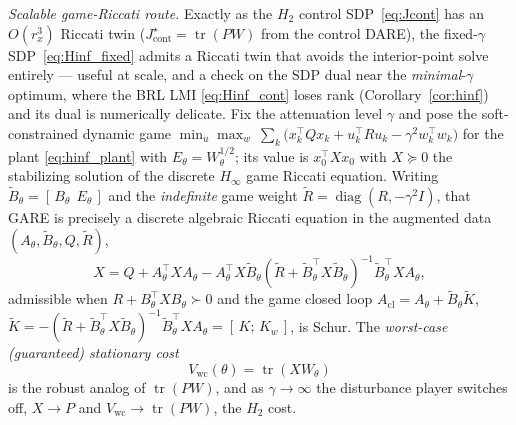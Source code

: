 \documentclass[twocolumn,amsthm]{autart}
\begin{document}
\emph{Scalable game-Riccati route.} Exactly as the $H_2$ control SDP~\eqref{eq:Jcont}
has an $O(r_x^3)$ Riccati twin ($J_{\mathrm{cont}}^\star=\operatorname{tr}(PW)$ from the
control DARE), the fixed-$\gamma$ SDP~\eqref{eq:Hinf_fixed} admits a Riccati twin that
avoids the interior-point solve entirely --- useful at scale, and a check on the SDP
dual near the \emph{minimal}-$\gamma$ optimum, where the BRL LMI \eqref{eq:Hinf_cont}
loses rank (Corollary~\ref{cor:hinf}) and its dual is numerically delicate. Fix the
attenuation level $\gamma$ and pose the
soft-constrained dynamic game
$\min_u\max_w\ \sum_k\big(x_k^\top Qx_k+u_k^\top Ru_k-\gamma^2 w_k^\top w_k\big)$
for the plant \eqref{eq:hinf_plant} with $E_\theta=W_\theta^{1/2}$; its value is
$x_0^\top X x_0$ with $X\succeq0$ the stabilizing solution of the discrete
$H_\infty$ game Riccati equation. Writing $\tilde B_\theta=[\,B_\theta\ \ E_\theta\,]$
and the \emph{indefinite} game weight
$\tilde R=\operatorname{diag}(R,-\gamma^2 I)$, that GARE is precisely a discrete
algebraic Riccati equation in the augmented data $(A_\theta,\tilde B_\theta,Q,\tilde R)$,
\begin{equation}\label{eq:gare}
X = Q + A_\theta^\top X A_\theta
 - A_\theta^\top X\tilde B_\theta(\tilde R+\tilde B_\theta^\top X\tilde B_\theta)^{-1}
   \tilde B_\theta^\top X A_\theta,
\end{equation}
admissible when $R+B_\theta^\top X B_\theta\succ0$ and the game closed loop
$A_{\mathrm{cl}}=A_\theta+\tilde B_\theta\tilde K$,
$\tilde K=-(\tilde R+\tilde B_\theta^\top X\tilde B_\theta)^{-1}\tilde B_\theta^\top X A_\theta
=[\,K;\,K_w\,]$, is Schur. The \emph{worst-case (guaranteed) stationary cost}
\begin{equation}\label{eq:hinf_value}
V_{\mathrm{wc}}(\theta) = \operatorname{tr}(X W_\theta)
\end{equation}
is the robust analog of $\operatorname{tr}(PW)$, and as $\gamma\!\to\!\infty$ the
disturbance player switches off, $X\!\to\!P$ and $V_{\mathrm{wc}}\!\to\!\operatorname{tr}(PW)$,
the $H_2$ cost.
\end{document}
